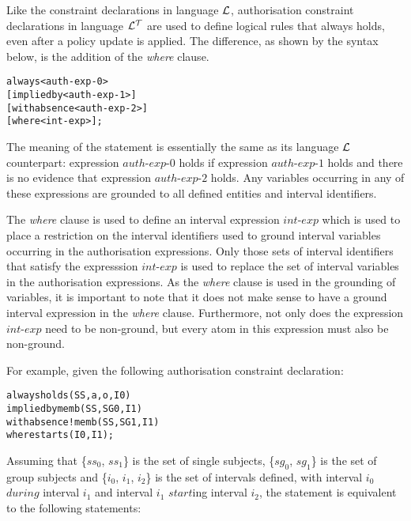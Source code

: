 \documentclass[11pt]{report}
\newenvironment{vverbatim}
{
  \begin{alltt}
}
{
  \vspace{-\baselineskip}
  \end{alltt}
}
\begin{document}
          Like the constraint declarations in language ${\cal L}$,
          authorisation constraint declarations in language ${\cal L^T}$ are
          used to define logical rules that always holds, even after a policy
          update is applied. The difference, as shown by the syntax below, is 
          the addition of the {\em where} clause.

          \begin{vverbatim}
  always <auth-exp-0>
    [implied by <auth-exp-1>]
    [with absence <auth-exp-2>]
    [where <int-exp>];
          \end{vverbatim}

          The meaning of the statement is essentially the same as its language
          ${\cal L}$ counterpart: expression $auth$-$exp$-$0$ holds if
          expression $auth$-$exp$-$1$ holds and there is no evidence that
          expression $auth$-$exp$-$2$ holds. Any variables occurring in
          any of these expressions are grounded to all defined entities and
          interval identifiers.

          The {\em where} clause is used to define an interval expression
          $int$-$exp$ which is used to place a restriction on the interval
          identifiers used to ground interval variables occurring in the
          authorisation expressions. Only those sets of interval identifiers
          that satisfy the expresssion $int$-$exp$ is used to replace the
          set of interval variables in the authorisation expressions. As the
          {\em where} clause is used in the grounding of variables, it is
          important to note that it does not make sense to have a ground
          interval expression in the {\em where} clause. Furthermore, not only
          does the expression $int$-$exp$ need to be non-ground, but every atom
          in this expression must also be non-ground.

          For example, given the following authorisation constraint
          declaration:

          \begin{vverbatim}
  always holds(SS, a, o, I0)
    implied by memb(SS, SG0, I1)
    with absence !memb(SS, SG1, I1)
    where starts(I0, I1);
          \end{vverbatim}

          \noindent
          Assuming that \{$ss_0$, $ss_1$\} is the set of single subjects,
          \{$sg_0$, $sg_1$\} is the set of group subjects and \{$i_0$, $i_1$,
          $i_2$\} is the set of intervals defined, with interval $i_0$ $during$
          interval $i_1$ and interval $i_1$ $start$ing interval $i_2$, the
          statement is equivalent to the following statements:
\end{document}
